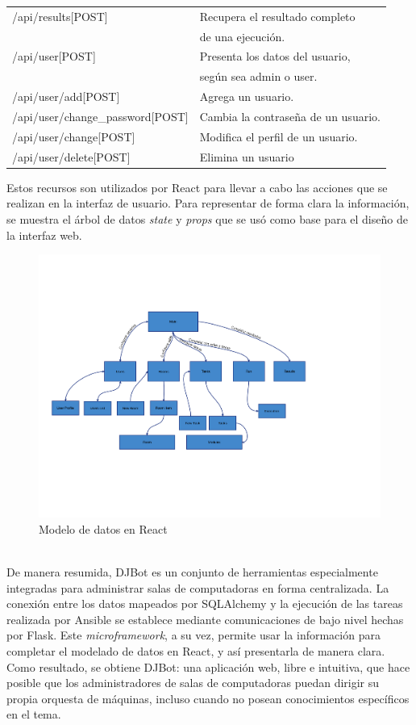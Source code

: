 \documentclass[a4paper,12pt]{article}
\begin{document}
{\begin{center}
\begin{tabulary}{\textwidth}{l|L}
/api/results[POST] & Recupera el resultado completo\\
 & de una ejecución.\\
/api/user[POST] & Presenta los datos del usuario,\\
 & según sea admin  o user.\\
/api/user/add[POST] & Agrega un usuario.\\
/api/user/change\_password[POST] & Cambia la contraseña de un usuario.\\
/api/user/change[POST] & Modifica el perfil de un usuario.\\
/api/user/delete[POST] & Elimina un usuario\\
\hline
\end{tabulary}
\end{center}
}

Estos recursos son utilizados por React para llevar a cabo las acciones que se realizan en la interfaz de usuario. Para representar de forma clara la información, se muestra el árbol de  datos \emph{state} y \emph{props} que se usó como base para el diseño de la interfaz web.\\

\begin{figure}[htb]
\centering
\includegraphics[width=\textwidth]{./img/statesandprops.png}
\caption{Modelo de datos en React}
\end{figure}\\

\newpage
De manera resumida, DJBot es un conjunto de herramientas especialmente integradas para administrar salas de computadoras en forma centralizada. La conexión entre los datos mapeados por SQLAlchemy y la ejecución de las tareas realizada por Ansible se establece mediante comunicaciones de bajo nivel hechas por Flask. Este \emph{microframework}, a su vez, permite usar la información para completar el modelado de datos en React, y así presentarla de manera clara. Como resultado, se obtiene DJBot: una aplicación web, libre e intuitiva, que hace posible que los administradores de salas de computadoras puedan dirigir su propia orquesta de máquinas, incluso cuando no posean conocimientos específicos en el tema.\\
\end{document}
